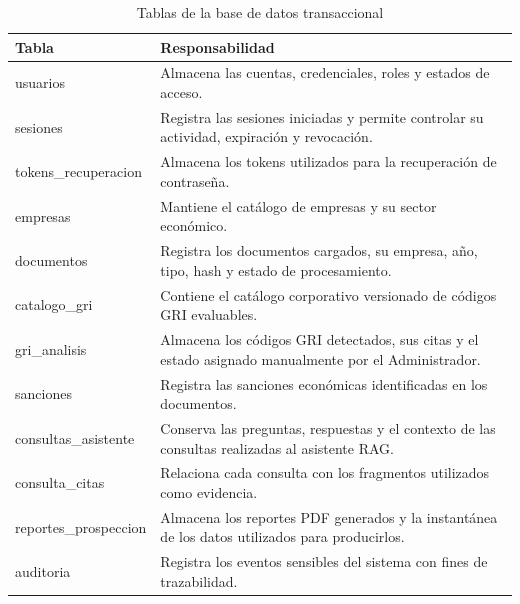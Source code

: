 \begin{table}[H]
\centering
\caption{Tablas de la base de datos transaccional}
\label{tab:tablas-transaccionales}
\renewcommand{\arraystretch}{1.25}
\small
\begin{tabularx}{\textwidth}{
    >{\raggedright\arraybackslash}p{4cm}
    >{\raggedright\arraybackslash}X
}
\toprule
\textbf{Tabla} & \textbf{Responsabilidad} \\
\midrule

usuarios
&
Almacena las cuentas, credenciales, roles y estados de acceso.
\\

sesiones
&
Registra las sesiones iniciadas y permite controlar su actividad,
expiración y revocación.
\\

tokens\_recuperacion
&
Almacena los tokens utilizados para la recuperación de contraseña.
\\

empresas
&
Mantiene el catálogo de empresas y su sector económico.
\\

documentos
&
Registra los documentos cargados, su empresa, año, tipo, hash y estado
de procesamiento.
\\

catalogo\_gri
&
Contiene el catálogo corporativo versionado de códigos GRI evaluables.
\\

gri\_analisis
&
Almacena los códigos GRI detectados, sus citas y el estado asignado
manualmente por el Administrador.
\\

sanciones
&
Registra las sanciones económicas identificadas en los documentos.
\\

consultas\_asistente
&
Conserva las preguntas, respuestas y el contexto de las consultas
realizadas al asistente RAG.
\\

consulta\_citas
&
Relaciona cada consulta con los fragmentos utilizados como evidencia.
\\

reportes\_prospeccion
&
Almacena los reportes PDF generados y la instantánea de los datos
utilizados para producirlos.
\\

auditoria
&
Registra los eventos sensibles del sistema con fines de trazabilidad.
\\

\bottomrule
\end{tabularx}
\end{table}

